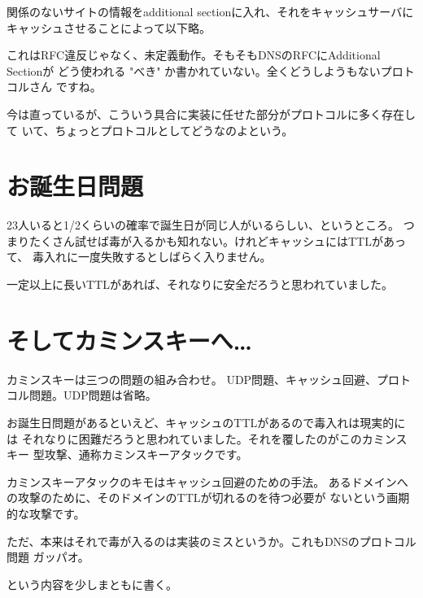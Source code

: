 関係のないサイトの情報をadditional sectionに入れ、それをキャッシュサーバに
キャッシュさせることによって以下略。

これはRFC違反じゃなく、未定義動作。そもそもDNSのRFCにAdditional Sectionが
どう使われる "べき" か書かれていない。全くどうしようもないプロトコルさん
ですね。

今は直っているが、こういう具合に実装に任せた部分がプロトコルに多く存在して
いて、ちょっとプロトコルとしてどうなのよという。

\section{お誕生日問題}
23人いると1/2くらいの確率で誕生日が同じ人がいるらしい、というところ。
つまりたくさん試せば毒が入るかも知れない。けれどキャッシュにはTTLがあって、
毒入れに一度失敗するとしばらく入りません。

一定以上に長いTTLがあれば、それなりに安全だろうと思われていました。


\section{そしてカミンスキーへ…}
カミンスキーは三つの問題の組み合わせ。
UDP問題、キャッシュ回避、プロトコル問題。UDP問題は省略。

お誕生日問題があるといえど、キャッシュのTTLがあるので毒入れは現実的には
それなりに困難だろうと思われていました。それを覆したのがこのカミンスキー
型攻撃、通称カミンスキーアタックです。%

カミンスキーアタックのキモはキャッシュ回避のための手法。
あるドメインへの攻撃のために、そのドメインのTTLが切れるのを待つ必要が
ないという画期的な攻撃です。

ただ、本来はそれで毒が入るのは実装のミスというか。これもDNSのプロトコル問題
ガッパオ。

という内容を少しまともに書く。
